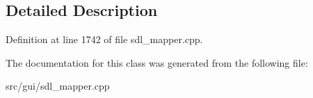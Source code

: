 \subsection{Detailed Description}


Definition at line 1742 of file sdl\-\_\-mapper.\-cpp.



The documentation for this class was generated from the following file\-:\begin{DoxyCompactItemize}
\item 
src/gui/sdl\-\_\-mapper.\-cpp\end{DoxyCompactItemize}
